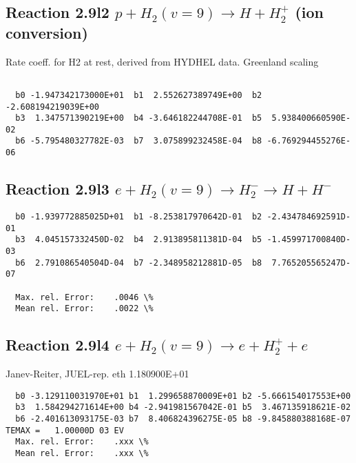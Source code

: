 \documentclass[12pt,dvipdfmx]{article}
\begin{document}
\subsection{
Reaction 2.9l2
$ p + H_2(v=9) \rightarrow H + H_2^+$ (ion conversion)
}
Rate coeff. for H2 at rest, derived from HYDHEL data. Greenland scaling


\begin{small}\begin{verbatim}

  b0 -1.947342173000E+01  b1  2.552627389749E+00  b2 -2.608194219039E+00
  b3  1.347571390219E+00  b4 -3.646182244708E-01  b5  5.938400660590E-02
  b6 -5.795480327782E-03  b7  3.075899232458E-04  b8 -6.769294455276E-06

\end{verbatim}\end{small}

\newpage


\subsection{
Reaction 2.9l3
 $ e + H_2(v=9) \rightarrow H_2^- \rightarrow H + H^-$
}


\begin{small}\begin{verbatim}
  b0 -1.939772885025D+01  b1 -8.253817970642D-01  b2 -2.434784692591D-01
  b3  4.045157332450D-02  b4  2.913895811381D-04  b5 -1.459971700840D-03
  b6  2.791086540504D-04  b7 -2.348958212881D-05  b8  7.765205565247D-07

  Max. rel. Error:    .0046 \%
  Mean rel. Error:    .0022 \%
\end{verbatim}\end{small}

\subsection{
Reaction 2.9l4
 $ e + H_2(v=9) \rightarrow e + H_2^+  + e$
}
Janev-Reiter, JUEL-rep. eth 1.180900E+01

\begin{small}\begin{verbatim}
  b0 -3.129110031970E+01 b1  1.299658870009E+01 b2 -5.666154017553E+00
  b3  1.584294271614E+00 b4 -2.941981567042E-01 b5  3.467135918621E-02
  b6 -2.401613093175E-03 b7  8.406824396275E-05 b8 -9.845880388168E-07
TEMAX =   1.00000D 03 EV
  Max. rel. Error:    .xxx \%
  Mean rel. Error:    .xxx \%
\end{verbatim}\end{small}
\end{document}
